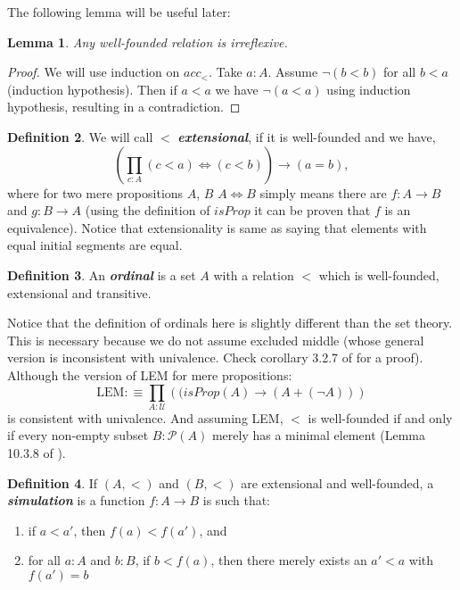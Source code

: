 \documentclass[11pt]{article}
\theoremstyle{definition}
\newtheorem{definition}{Definition}[section]
\theoremstyle{plain}
\newtheorem{lemma}[definition]{Lemma}
\theoremstyle{remark}
\newcommand{\U}{\mathscr{U}}
\newcommand{\Po}{\mathscr{P}}
\begin{document}
The following lemma will be useful later:
\begin{lemma}\label{L:Wf implies irr}
Any well-founded relation is irreflexive.
\end{lemma}

\begin{proof}
We will use induction on $acc_<$. Take $a : A$. Assume $\neg(b < b)$ for all $b<a$ 
(induction hypothesis). Then if $a < a$ we have $\neg(a < a)$ using induction hypothesis,
resulting in a contradiction.
\end{proof}

\begin{definition}\label{D:Ext}
We will call $<$ \textbf{\textit{extensional}}, if it is well-founded and we have,
\[ \left( \prod_{c : A}  (c<a) \iff (c<b) \right) \to (a = b),\]
where for two mere propositions $A$, $B$ $A\iff B$ simply means there are $f : A \to B$ and 
$g : B \to A$ (using the definition of $isProp$ it can be proven that $f$ is an equivalence).
Notice that extensionality is same as saying that elements with equal initial segments
are equal.
\end{definition} 

\begin{definition}
An \textbf{\textit{ordinal}} is a set $A$ with a relation $<$ which is well-founded, 
extensional and transitive.
\end{definition}

Notice that the definition of ordinals here is slightly different than the set theory. This
is necessary because we do not assume excluded middle (whose general version is 
inconsistent with univalence. Check corollary 3.2.7 of \cite{Hott} for a proof). Although
the version of LEM for mere propositions:
\[ \text{LEM} :\equiv \prod_{A : \U} \left((isProp(A) \to (A + (\neg A))\right) \]  
is consistent with univalence. And assuming LEM, $<$ is well-founded if and only if every
non-empty subset $B:\Po (A)$ merely has a minimal element (Lemma 10.3.8 of \cite{Hott}).

\begin{definition}\label{D:sim}
If $(A,<)$ and $(B,<)$ are extensional and well-founded, a \textbf{\textit{simulation}} is
a function $f : A \to B$ is such that:
\begin{enumerate}
\item if $a < a'$, then $f(a) < f(a')$, and
\item for all $a : A$ and $b : B$, if $b < f(a)$, then there merely exists an $a' < a$ with
      $f(a') = b$
\end{enumerate}
\end{definition} 
\end{document}
